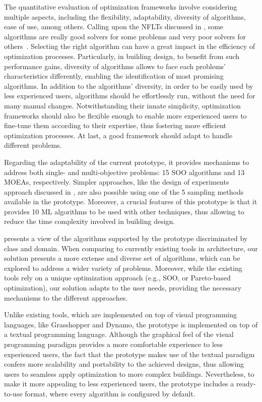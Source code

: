 The quantitative evaluation of optimization frameworks involve considering multiple aspects, including the flexibility, adaptability, diversity of algorithms, ease of use, among others. Calling upon the \acp{NFLT} discussed in , some algorithms are really good solvers for some problems and very poor solvers for others~\cite{Wolpert1997NFLT}. Selecting the right algorithm can have a great impact in the efficiency of optimization processes. Particularly, in building design, to benefit from such performance gains, diversity of algorithms allows to face each problems' characteristics differently, enabling the identification of most promising algorithms. In addition to the algorithms' diversity, in order to be easily used by less experienced users, algorithms should be effortlessly run, without the need for many manual changes. Notwithstanding their innate simplicity, optimization frameworks should also be flexible enough to enable more experienced users to fine-tune them according to their expertise, thus fostering more efficient optimization processes. At last, a good framework should adapt to handle different problems.

Regarding the adaptability of the current prototype, it provides mechanisms to address both single- and multi-objective problems: 15 \ac{SOO} algorithms and 13 \acp{MOEA}, respectively. Simpler approaches, like the design of experiments approach discussed in , are also possible using one of the 5 sampling methods available in the prototype. Moreover, a crucial features of this prototype is that it provides 10 \ac{ML} algorithms to be used with other techniques, thus allowing to reduce the time complexity involved in building design. 


 presents a view of the algorithms supported by the prototype discriminated by class and domain. When comparing to currently existing tools in architecture, our solution presents a more extense and diverse set of algorithms, which can be explored to address a wider variety of problems. Moreover, while the existing tools rely on a unique optimization approach (e.g., \ac{SOO}, or Pareto-based optimization), our solution adapts to the user needs, providing the necessary mechanisms to the different approaches.

Unlike existing tools, which are implemented on top of visual programming languages, like Grasshopper and Dynamo, the prototype is implemented on top of a textual programming language. Although the graphical feel of the visual programming paradigm provides a more comfortable experience to less experienced users, the fact that the prototype makes use of the textual paradigm confers more scalability and portability to the achieved designs, thus allowing users to seamless apply optimization to more complex buildings. Nevertheless, to make it more appealing to less experienced users, the prototype includes a ready-to-use format, where every algorithm is configured by default.  

